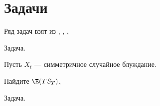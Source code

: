 















\section{Задачи} 

Ряд задач взят из \cite{stirzaker:prp}, \cite{stirzaker:otep}, \cite{zastawniak:bsp}, \cite{blom:pspt}


Задача. 


Пусть $X_{t}$ --- симметричное случайное блуждание.

Найдите $\E(TS_{T})$,

Задача. \cite{wilmott:chap} %


